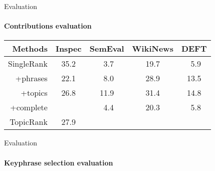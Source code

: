   \begin{frame}{Evaluation}
    \framesubtitle{Contributions evaluation}
    
    \begin{center}
      \begin{tabular}{rcccc}
        \toprule
        Methods & Inspec & SemEval & WikiNews & DEFT\\
        \midrule
        SingleRank & 35.2 & $~~$3.7 & 19.7 & $~~$5.9\\
        +phrases & 22.1 & $~~$8.0 & 28.9 & 13.5\\
        +topics & 26.8 & 11.9 & 31.4 & 14.8\\
        +complete &  \cellcolor{pink}{35.5} & $~~$4.4 & 20.3 & $~~$5.8\\
        TopicRank & 27.9 & \cellcolor{pink}{12.1} & \cellcolor{pink}{35.6} & \cellcolor{pink}{15.1}\\
        \bottomrule
      \end{tabular}
    \end{center}
  \end{frame}

  \begin{frame}{Evaluation}
    \framesubtitle{Keyphrase selection evaluation}
    
    \begin{center}
    \end{center}
  \end{frame}

